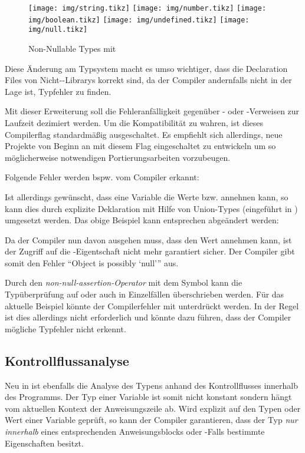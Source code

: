 \begin{figure}[htb]
	\centering
	\texttt{[image: img/string.tikz]}
	\texttt{[image: img/number.tikz]}
	\texttt{[image: img/boolean.tikz]}
	\texttt{[image: img/undefined.tikz]}
	\texttt{[image: img/null.tikz]}
	\caption{Non-Nullable Types mit }
	\label{fig:Non-Nullable}
\end{figure}

Diese Änderung am Typsystem macht es umso wichtiger, dass die Declaration Files von Nicht-\ts-Librarys korrekt sind, da der Compiler andernfalls nicht in der Lage ist, Typfehler zu finden.

Mit dieser Erweiterung soll die Fehleranfälligkeit gegenüber \tsnull- oder \tsundefined-Verweisen zur Laufzeit dezimiert werden.  Um die Kompatibilität zu wahren, ist dieses Compilerflag standardmäßig ausgeschaltet. Es empfiehlt sich allerdings, neue Projekte von Beginn an mit diesem Flag eingeschaltet zu entwickeln um so möglicherweise notwendigen Portierungsarbeiten vorzubeugen.

Folgende Fehler werden bspw. vom Compiler erkannt:


Ist allerdings gewünscht, dass eine Variable die Werte \tsnull bzw. \tsundefined annehnen kann, so kann dies durch explizite Deklaration mit Hilfe von Union-Types (eingeführt in ) umgesetzt werden. Das obige Beispiel kann entsprechen abgeändert werden:


Da der Compiler nun davon ausgehen muss, dass  den Wert \tsnull annehmen kann, ist der Zugriff auf die -Eigentschaft nicht mehr garantiert sicher. Der Compiler gibt somit den Fehler ``Object is possibly `null''' aus.

Durch den \emph{non-null-assertion-Operator} mit dem Symbol \tsin{!} kann die Typüberprüfung auf \tsnull oder \tsundefined auch in Einzelfällen überschrieben werden. Für das aktuelle Beispiel könnte der Compilerfehler mit  unterdrückt werden. In der Regel ist dies allerdings nicht erforderlich und könnte dazu führen, dass der Compiler mögliche Typfehler nicht erkennt.

\subsection{Kontrollflussanalyse}
Neu in  ist ebenfalls die Analyse des Typens anhand des Kontrollflusses innerhalb des Programms. Der Typ einer Variable ist somit nicht konstant sondern hängt vom aktuellen Kontext der Anweisungszeile ab.
Wird explizit auf den Typen oder Wert einer Variable geprüft, so kann der Compiler garantieren, dass der Typ \emph{nur innerhalb} eines entsprechenden Anweisungsblocks oder -Falls bestimmte Eigenschaften besitzt.

